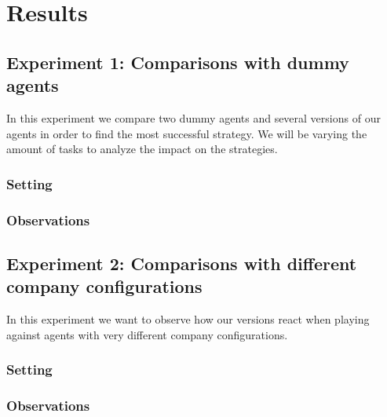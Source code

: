 \documentclass[11pt]{article}
\begin{document}
\section{Results}

\subsection{Experiment 1: Comparisons with dummy agents}
In this experiment we compare two dummy agents and several versions of our agents in order to find the most successful strategy. We will be varying the amount of tasks to analyze the impact on the strategies. 




\subsubsection{Setting}

\subsubsection{Observations}


\subsection{Experiment 2: Comparisons with different company configurations}
In this experiment we want to observe how our versions react when playing against agents with very different company configurations. 


\subsubsection{Setting}

\subsubsection{Observations}
\end{document}
